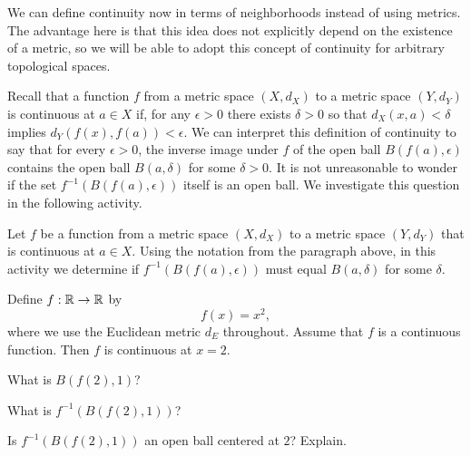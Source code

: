 \begin{comment}

\ActivitySolution
\ba
\item We need to show that there is an open ball around $b$ that is entirely contained in $B(a, \delta)$. 


\item Let $\beta = d(a,b)$ and let $\gamma = \delta - \beta$. Let $c \in B(b,\gamma)$. Then 
\[d(a,c) \leq d(a,b) + d(b,c) < \beta + \gamma = \beta + (\delta - \beta) = \delta.\]
So $c \in B(a,\delta)$ and $B(b,\gamma) \subset B(a,\delta)$.  

\item This statement is not true. Consider $A = (0,1) \cup (2,3)$ as a subset of $\R$ with the Euclidean metric. The set $A$ is a neighborhood of each of its points, but $A$ is not an open ball -- rather $A$ is the union of two disjoint open balls. 

\ea

\end{comment}

\label{sec_cont_neighborhoods}
We can define continuity now in terms of neighborhoods instead of using metrics. The advantage here is that this idea does not explicitly depend on the existence of a metric, so we will be able to adopt this concept of continuity for arbitrary topological spaces. 

Recall that a function $f$ from a metric space $(X, d_X)$ to a metric space $(Y, d_Y)$ is continuous at $a \in X$ if, for any $\epsilon > 0$ there exists $\delta > 0$ so that $d_X(x,a) < \delta$ implies $d_Y(f(x),f(a)) < \epsilon$. We can interpret this definition of continuity to say that for every $\epsilon > 0$, the inverse image under $f$ of the open ball $B(f(a), \epsilon)$ contains the open ball $B(a, \delta)$ for some $\delta > 0$. It is not unreasonable to wonder if the set $f^{-1}\left(B(f(a), \epsilon)\right)$ itself is an open ball. We investigate this question in the following activity. 

\begin{activity} \label{act:OB_1} Let $f$ be a function from a metric space $(X, d_X)$ to a metric space $(Y, d_Y)$ that is continuous at $a \in X$. Using the notation from the paragraph above, in this activity we determine if $f^{-1}\left(B(f(a), \epsilon)\right)$ must equal $B(a, \delta)$ for some $\delta$.

Define $f : \mathbb{R} \to \mathbb{R}$ by 
\[f(x) = x^2,\]
where we use the Euclidean metric $d_E$ throughout.  Assume that $f$ is a continuous function.  Then $f$ is continuous at $x=2$.
\ba
\item What is $B(f(2), 1)$? 

\item What is $f^{-1}\left(B(f(2), 1)\right)$?

\item Is $f^{-1}\left(B(f(2), 1)\right)$ an open ball centered at $2$? Explain.

\ea

\end{activity}
 
